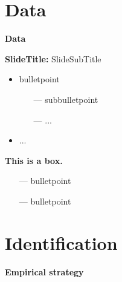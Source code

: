 \documentclass{beamer} %
\begin{document}
\section{Data}

{
	\begin{frame}[plain]		
    	\vspace{1cm}
    	{\color{white}\LARGE \textbf{Data}}
    \end{frame}
    \addtocounter{framenumber}{-1}
}

\begin{frame}{\textbf{SlideTitle:} SlideSubTitle}
	\begin{itemize}
          \item bulletpoint \citep{Kreiss2022}
    	\begin{itemize}
    	    \item[---] subbulletpoint
    	    \item[---] ...
    	\end{itemize}
    	\item ...
	\end{itemize}
	\vspace{.4cm}
	\begin{finding*}
	{\hspace{-.4cm}\textcolor{lmu-green}{\textbf{This is a box.}}}{
	    \begin{itemize}
	        \item[---] bulletpoint
	        \item[---] bulletpoint
	    \end{itemize}
	}
	\end{finding*}
\end{frame}

\section{Identification}
{
	\begin{frame}[plain]		
		\vspace{1cm}
		{\color{white}\LARGE \textbf{Empirical strategy}}
	\end{frame}
	\addtocounter{framenumber}{-1}
}
\end{document}
